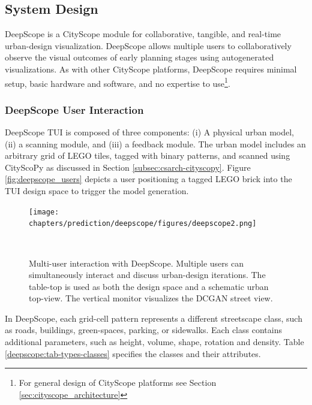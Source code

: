 {    \subsection{System Design}\label{DeepScope-system-architecture}
    {
        DeepScope is a CityScope module for collaborative, tangible, and real-time urban-design visualization. DeepScope allows multiple users to collaboratively observe the visual outcomes of early planning stages using autogenerated visualizations. As with other CityScope platforms, DeepScope requires minimal setup, basic hardware and software, and no expertise to use\footnote{For general design of CityScope platforms see Section \eqref{sec:cityscope_architecture}}.

        \subsubsection{DeepScope User Interaction}\label{DeepScope-user-interaction}
        {
            DeepScope TUI is composed of three components: (i) A physical urban model, (ii) a scanning module, and (iii) a feedback module. The urban model includes an arbitrary grid of LEGO tiles, tagged with binary patterns, and scanned using CityScoPy as discussed in Section \eqref{subsec:csarch-cityscopy}. Figure \eqref{fig:deepscope_users} depicts a user positioning a tagged LEGO brick into the TUI design space to trigger the model generation.

            \begin{figure}[!htb]
                \centering
                \texttt{[image: chapters/prediction/deepscope/figures/deepscope2.png]}
                \caption{
                    Multi-user interaction with DeepScope.
                    Multiple users can simultaneously interact and discuss urban-design iterations. The table-top is used as both the design space and a schematic urban top-view. The vertical monitor visualizes the DCGAN street view.
                }~\label{fig:deepscope_users}
            \end{figure}

            In DeepScope, each grid-cell pattern represents a different streetscape class, such as roads, buildings, green-spaces, parking, or sidewalks. Each class contains additional parameters, such as height, volume, shape, rotation and density. Table \eqref{deepscope:tab-types-classes} specifies the classes and their attributes.


}}}
